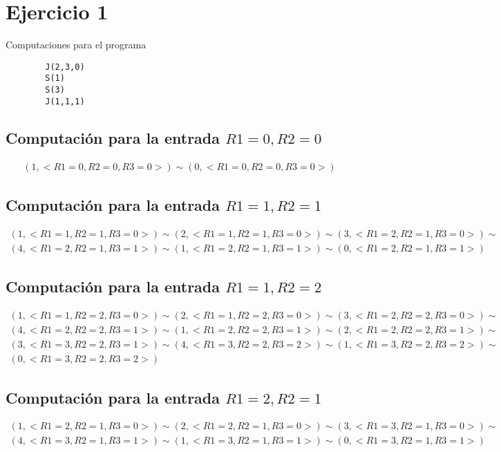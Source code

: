 \section{Ejercicio 1}
		Computaciones para el programa
		\begin{verbatim}
		J(2,3,0)
		S(1)
		S(3)
		J(1,1,1)
		\end{verbatim}
  		\subsection{Computación para la entrada $R1=0, R2=0$}
		\begin{equation*}\begin{gathered}
		(1, <R1=0, R2=0, R3=0>) \sim (0, <R1=0, R2=0, R3=0>)
		\end{gathered}\end{equation*}
		\subsection{Computación para la entrada $R1=1, R2=1$}
		\begin{equation*}\begin{gathered}
		(1, <R1=1, R2=1, R3=0>) \sim (2, <R1=1, R2=1, R3=0>) \sim (3, <R1=2, R2=1, R3=0>) \sim\\
		(4, <R1=2, R2=1, R3=1>) \sim (1, <R1=2, R2=1, R3=1>) \sim (0, <R1=2, R2=1, R3=1>)
		\end{gathered}\end{equation*}
		\subsection{Computación para la entrada $R1=1, R2=2$}
		\begin{equation*}\begin{gathered}
		(1, <R1=1, R2=2, R3=0>) \sim (2, <R1=1, R2=2, R3=0>) \sim (3, <R1=2, R2=2, R3=0>) \sim\\
		(4, <R1=2, R2=2, R3=1>) \sim (1, <R1=2, R2=2, R3=1>) \sim (2, <R1=2, R2=2, R3=1>) \sim\\
		(3, <R1=3, R2=2, R3=1>) \sim (4, <R1=3, R2=2, R3=2>) \sim (1, <R1=3, R2=2, R3=2>) \sim\\
		(0, <R1=3, R2=2, R3=2>)
		\end{gathered}\end{equation*}
		\subsection{Computación para la entrada $R1=2, R2=1$}
		\begin{equation*}\begin{gathered}
		(1, <R1=2, R2=1, R3=0>) \sim (2, <R1=2, R2=1, R3=0>) \sim (3, <R1=3, R2=1, R3=0>) \sim\\
		(4, <R1=3, R2=1, R3=1>) \sim (1, <R1=3, R2=1, R3=1>) \sim (0, <R1=3, R2=1, R3=1>)
		\end{gathered}\end{equation*}
